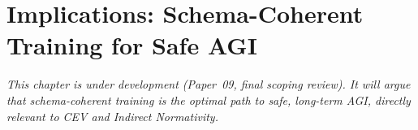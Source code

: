 \chapter{Implications: Schema-Coherent Training for Safe AGI}
\label{ch:implications}

\textit{This chapter is under development (Paper~09, final scoping review). It will argue
that schema-coherent training is the optimal path to safe, long-term AGI, directly
relevant to CEV and Indirect Normativity.}
